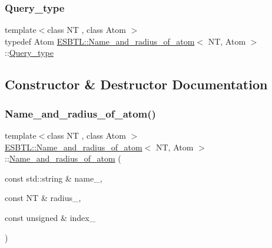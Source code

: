 \mbox{\label{classESBTL_1_1Name__and__radius__of__atom_a25cd0647ee4c593a1736b2abce11762d}} 
\subsubsection{\texorpdfstring{Query\+\_\+type}{Query\_type}}
{\footnotesize\ttfamily template$<$class NT , class Atom $>$ \\
typedef Atom \hyperlink{classESBTL_1_1Name__and__radius__of__atom}{E\+S\+B\+T\+L\+::\+Name\+\_\+and\+\_\+radius\+\_\+of\+\_\+atom}$<$ NT, Atom $>$\+::\hyperlink{classESBTL_1_1Name__and__radius__of__atom_a25cd0647ee4c593a1736b2abce11762d}{Query\+\_\+type}}



\subsection{Constructor \& Destructor Documentation}
\mbox{\label{classESBTL_1_1Name__and__radius__of__atom_a871dcf4baf9db1bbb3f1bf50788a74b2}} 
\subsubsection{\texorpdfstring{Name\+\_\+and\+\_\+radius\+\_\+of\+\_\+atom()}{Name\_and\_radius\_of\_atom()}}
{\footnotesize\ttfamily template$<$class NT , class Atom $>$ \\
\hyperlink{classESBTL_1_1Name__and__radius__of__atom}{E\+S\+B\+T\+L\+::\+Name\+\_\+and\+\_\+radius\+\_\+of\+\_\+atom}$<$ NT, Atom $>$\+::\hyperlink{classESBTL_1_1Name__and__radius__of__atom}{Name\+\_\+and\+\_\+radius\+\_\+of\+\_\+atom} (\begin{DoxyParamCaption}\item[{const std\+::string \&}]{name\+\_\+,  }\item[{const NT \&}]{radius\+\_\+,  }\item[{const unsigned \&}]{index\+\_\+ }\end{DoxyParamCaption})\hspace{0.3cm}{\ttfamily [inline]}}



